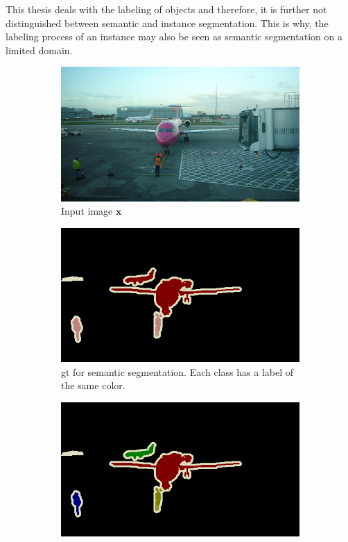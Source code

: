 This thesis deals with the labeling of objects and therefore, it is further not distinguished between semantic and instance segmentation.
This is why, the labeling process of an instance may also be seen as semantic segmentation on a limited domain.
\begin{figure} [h]
	\centering
	\begin{subfigure}[t]{0.3\textwidth}
		\centering
		\includegraphics[width=\textwidth]{figures/chap22_image.jpg}
		\caption{
			Input image $\textbf{x}$
		}\label{fig:ch2:sec2:image}
	\end{subfigure}
	\hfill
	\begin{subfigure}[t]{0.3\textwidth}
		\centering
		\includegraphics[width=\textwidth]{figures/chap22_semantic_seg.png}
		\caption{
			\gls{gt} for semantic segmentation.
			Each class has a label of the same color.
		} \label{fig:ch2:sec2:semantic_seg}
	\end{subfigure}
	\hfill
	\begin{subfigure}[t]{0.3\textwidth}
		\centering
		\includegraphics[width=\textwidth]{figures/chap22_instance_seg.png}

\end{subfigure}
\end{figure}

